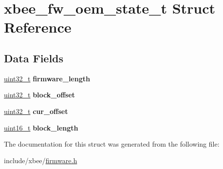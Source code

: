 \hypertarget{structxbee__fw__oem__state__t}{}\section{xbee\+\_\+fw\+\_\+oem\+\_\+state\+\_\+t Struct Reference}
\label{structxbee__fw__oem__state__t}
\subsection*{Data Fields}
\begin{DoxyCompactItemize}
\item 
\hyperlink{group__hal__dos_ga09a1e304d66d35dd47daffee9731edaa}{uint32\+\_\+t} {\bfseries firmware\+\_\+length}
\item 
\hyperlink{group__hal__dos_ga09a1e304d66d35dd47daffee9731edaa}{uint32\+\_\+t} {\bfseries block\+\_\+offset}
\item 
\hyperlink{group__hal__dos_ga09a1e304d66d35dd47daffee9731edaa}{uint32\+\_\+t} {\bfseries cur\+\_\+offset}
\item 
\hyperlink{group__hal__dos_ga5a8b2dc9e45a9ee81a94ef304fb62505}{uint16\+\_\+t} {\bfseries block\+\_\+length}
\end{DoxyCompactItemize}


The documentation for this struct was generated from the following file\+:\begin{DoxyCompactItemize}
\item 
include/xbee/\hyperlink{firmware_8h}{firmware.\+h}\end{DoxyCompactItemize}
